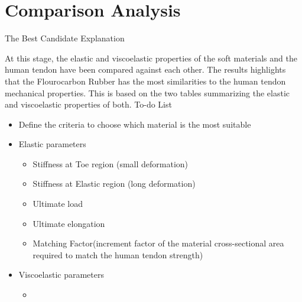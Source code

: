 \section{Comparison Analysis}




{\huge The Best Candidate Explanation}

At this stage, the elastic and viscoelastic properties of the soft materials and the human tendon have been compared against each other. The results highlights that the Flourocarbon Rubber  has the most similarities to the human tendon mechanical properties. This is based on the two tables summarizing the elastic and viscoelastic properties of both.
To-do List
\begin{itemize}
    \item Define the criteria to choose which material is the most suitable
    \item Elastic parameters
    \begin{itemize}
        \item Stiffness at Toe region (small deformation)
        \item Stiffness at Elastic region (long deformation)
        \item Ultimate load
        \item Ultimate elongation
        \item Matching Factor(increment factor of the material cross-sectional area required to match the human tendon strength)
        
    \end{itemize}
    \item Viscoelastic parameters
    \begin{itemize}
        \item 
    \end{itemize}
\end{itemize}
